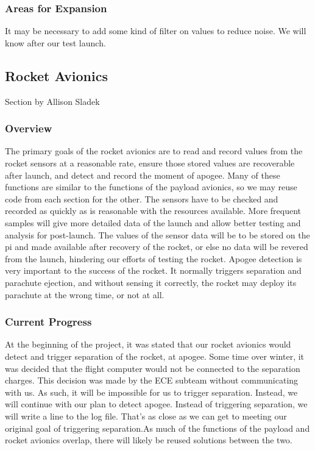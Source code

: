 \documentclass[onecolumn, draftclsnofoot, 10pt, compsoc]{IEEEtran}
\begin{document}
\subsubsection{Areas for Expansion}
It may be necessary to add some kind of filter on values to reduce noise. We will know after our test launch.
\subsection{Rocket Avionics}
Section by Allison Sladek
\subsubsection{Overview}
The primary goals of the rocket avionics are to read and record values from the rocket sensors at a reasonable rate, ensure those stored values are recoverable after launch, and detect and record the moment of apogee.
Many of these functions are similar to the functions of the payload avionics, so we may reuse code from each section for the other.
The sensors have to be checked and recorded as quickly as is reasonable with the resources available.
More frequent samples will give more detailed data of the launch and allow better testing and analysis for post-launch.
The values of the sensor data will be to be stored on the pi and made available after recovery of the rocket, or else no data will be revered from the launch, hindering our efforts of testing the rocket.
Apogee detection is very important to the success of the rocket. It normally triggers separation and parachute ejection, and without sensing it correctly, the rocket may deploy its parachute at the wrong time, or not at all.

\subsubsection{Current Progress}
At the beginning of the project, it was stated that our rocket avionics would detect and trigger separation of the rocket, at apogee.
Some time over winter, it was decided that the flight computer would not be connected to the separation charges.
This decision was made by the ECE subteam without communicating with us.  As such, it will be impossible for us to trigger separation.
Instead, we will continue with our plan to detect apogee.  Instead of triggering separation, we will write a line to the log file.  That's as close as we can get to meeting our original goal of triggering separation.As much of the functions of the payload and rocket avionics overlap, there will likely be reused solutions between the two.
\end{document}

